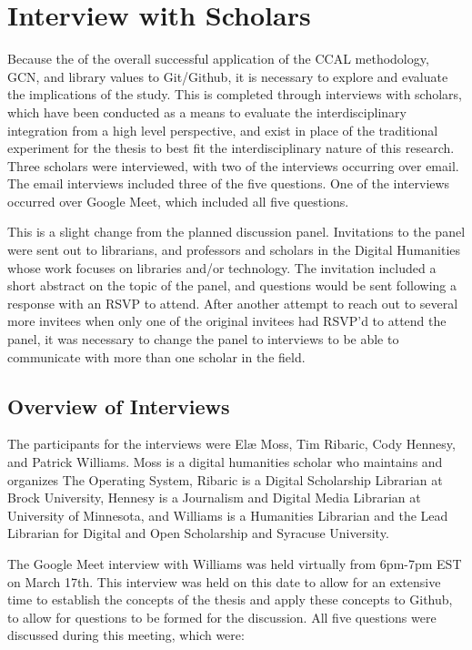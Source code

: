 \section{Interview with Scholars}

Because the of the overall successful application of the CCAL methodology, GCN, and library values to Git/Github, it is necessary to explore and evaluate the implications of the study. This is completed through interviews with scholars, which have been conducted as a means to evaluate the interdisciplinary integration from a high level perspective, and exist in place of the traditional experiment for the thesis to best fit the interdisciplinary nature of this research. Three scholars were interviewed, with two of the interviews occurring over email. The email interviews included three of the five questions. One of the interviews occurred over Google Meet, which included all five questions.

This is a slight change from the planned discussion panel. Invitations to the panel were sent out to librarians, and professors and scholars in the Digital Humanities whose work focuses on libraries and/or technology. The invitation included a short abstract on the topic of the panel, and questions would be sent following a response with an RSVP to attend. After another attempt to reach out to several more invitees when only one of the original invitees had RSVP'd to attend the panel, it was necessary to change the panel to interviews to be able to communicate with more than one scholar in the field. 

\subsection{Overview of Interviews}

The participants for the interviews were Elæ Moss, Tim Ribaric, Cody Hennesy, and Patrick Williams. Moss is a digital humanities scholar who maintains and organizes The Operating System, Ribaric is a Digital Scholarship Librarian at Brock University, Hennesy is a Journalism and Digital Media Librarian at University of Minnesota, and Williams is a Humanities Librarian and the Lead Librarian for Digital and Open Scholarship and Syracuse University. 

The Google Meet interview with Williams was held virtually from 6pm-7pm EST on March 17th. This interview was held on this date to allow for an extensive time to establish the concepts of the thesis and apply these concepts to Github, to allow for questions to be formed for the discussion. All five questions were discussed during this meeting, which were: 

